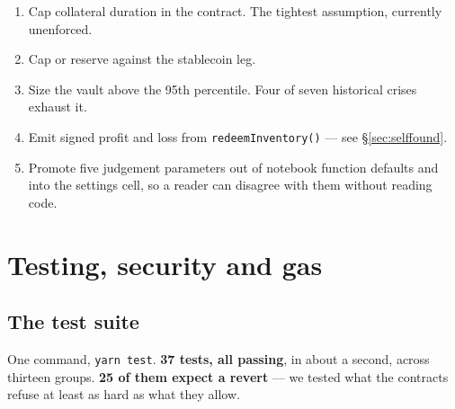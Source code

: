 \documentclass[11pt,a4paper]{article}
\begin{document}
\begin{enumerate}
  \item Cap collateral duration in the contract. The tightest assumption, currently unenforced.
  \item Cap or reserve against the stablecoin leg.
  \item Size the vault above the 95th percentile. Four of seven historical crises exhaust it.
  \item Emit signed profit and loss from \texttt{redeemInventory()} --- see \S\ref{sec:selffound}.
  \item Promote five judgement parameters out of notebook function defaults and into the settings
  cell, so a reader can disagree with them without reading code.
\end{enumerate}

\section{Testing, security and gas}\label{sec:testing}

\subsection{The test suite}

One command, \texttt{yarn test}. \textbf{37 tests, all passing}, in about a second, across thirteen
groups. \textbf{25 of them expect a revert} — we tested what the contracts refuse at least as hard
as what they allow.
\end{document}
